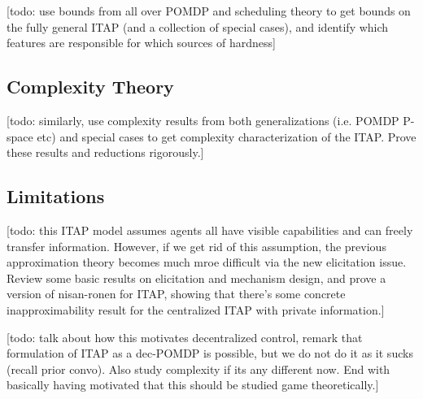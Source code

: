 [todo: use bounds from all over POMDP and scheduling theory to get bounds on the fully general ITAP (and a collection of special cases), and identify which features are responsible for which sources of hardness]

\subsection{Complexity Theory}
[todo: similarly, use complexity results from both generalizations (i.e. POMDP P-space etc) and special cases to get complexity characterization of the ITAP. Prove these results and reductions rigorously.]


\subsection{Limitations}

[todo: this ITAP model assumes agents all have visible capabilities and can freely transfer information. However, if we get rid of this assumption, the previous approximation theory becomes much mroe difficult via the new elicitation issue. Review some basic results on elicitation and mechanism design, and prove a version of nisan-ronen for ITAP, showing that there's some concrete inapproximability result for the centralized ITAP with private information.]


[todo: talk about how this motivates decentralized control, remark that formulation of ITAP as a dec-POMDP is possible, but we do not do it as it sucks (recall prior convo). Also study complexity if its any different now. End with basically having motivated that this should be studied game theoretically.]


